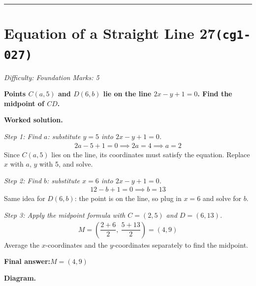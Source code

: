 \documentclass[11pt]{article}
\newcommand{\question}[1]{\par\medskip\noindent\textbf{#1}\par}
\begin{document}
\medskip\hrule

\section*{Equation of a Straight Line 27\quad\small\texttt{(cg1-027)}}
\textit{Difficulty: Foundation \quad\textbar\quad Marks: 5}

\question{Points \( C(a, 5) \) and \( D(6, b) \) lie on the line \( 2x - y + 1 = 0 \). Find the midpoint of \( CD \).}

\textbf{Worked solution.}

\textit{Step 1: Find \( a \): substitute \( y = 5 \) into \( 2x - y + 1 = 0 \).}
\[\begin{gathered}
2a - 5 + 1 = 0 \implies 2a = 4 \implies a = 2
\end{gathered}\]
Since \(C(a, 5)\) lies on the line, its coordinates must satisfy the equation. Replace \(x\) with \(a\), \(y\) with 5, and solve.

\textit{Step 2: Find \( b \): substitute \( x = 6 \) into \( 2x - y + 1 = 0 \).}
\[\begin{gathered}
12 - b + 1 = 0 \implies b = 13
\end{gathered}\]
Same idea for \(D(6, b)\): the point is on the line, so plug in \(x = 6\) and solve for \(b\).

\textit{Step 3: Apply the midpoint formula with \( C = (2, 5) \) and \( D = (6, 13) \).}
\[\begin{gathered}
M = \left(\dfrac{2 + 6}{2},\ \dfrac{5 + 13}{2}\right) = (4, 9)
\end{gathered}\]
Average the \(x\)-coordinates and the \(y\)-coordinates separately to find the midpoint.

\begin{answerbox}
\textbf{Final answer:}\quad \(\displaystyle M = (4, 9)\)
\end{answerbox}
\textbf{Diagram.}
\end{document}
